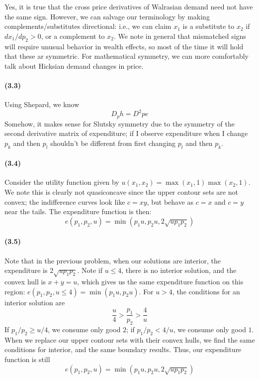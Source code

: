 \documentclass[10pt,letter]{article}
\begin{document}
Yes, it is true that the cross price derivatives of Walrasian demand need not have the same sign. However, we can salvage our terminology by making complements/substitutes directional: i.e., we can claim $x_1$ is a substitute to $x_2$ if $dx_1/dp_2 > 0$, or a complement to $x_2$. We note in general that mismatched signs will require unusual behavior in wealth effects, so most of the time it will hold that these ar symmetric. For mathematical symmetry, we can more comfortably talk about Hicksian demand changes in price.

\paragraph{(3.3)}
Using Shepard, we know
\[ D_p h = D^2p e \]
Somehow, it makes sense for Slutsky symmetry due to the symmetry of the second derivative matrix of expenditure; if I observe expenditure when I change $p_k$ and then $p_l$ shouldn't be different from first changing $p_l$ and then $p_k$.
\paragraph{(3.4)}
Consider the utility function given by $u(x_1, x_2) = \max(x_1, 1)\max(x_2, 1)$. We note this is clearly not quasiconcave since the upper contour sets are not convex; the indifference curves look like $c = xy$, but behave as $c=x$ and $c=y$ near the tails. The expenditure function is then:
\[ e(p_1, p_2, u) = \min(p_1 u, p_2 u, 2\sqrt{up_1p_2}) \]
\paragraph{(3.5)}
Note that in the previous problem, when our solutions are interior, the expenditure is $2 \sqrt{u p_1 p_2}$. Note if $u \le 4$, there is no interior solution, and the convex hull is $x+y = u$, which gives us the same expenditure function on this region: $e(p_1, p_2, u \le 4) = \min(p_1 u, p_2 u)$. For $u > 4$, the conditions for an interior solution are
\[ \frac{u}{4} > \frac{p_1}{p_2} > \frac{4}{u}\]
If $p_1/p_2 \ge u/4$, we consume only good $2$; if $p_1/p_2 < 4/u$, we consume only good $1$. When we replace our upper contour sets with their convex hulls, we find the same conditions for interior, and the same boundary results. Thus, our expenditure function is still
\[ e(p_1, p_2, u) = \min(p_1 u, p_2 u, 2\sqrt{up_1p_2}) \]
\end{document}
